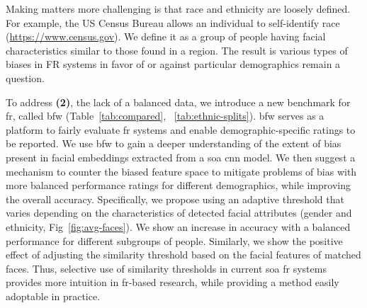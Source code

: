 Making matters more challenging is that race and ethnicity are loosely defined.  For example, the US Census Bureau allows an individual to self-identify race (\href{https://www.census.gov/mso/www/training/pdf/race-ethnicity-onepager.pdf}{https://www.census.gov}). We define it as a group of people having facial characteristics similar to those found in a region. The result is various types of biases in FR systems in favor of or against particular demographics remain a question.



To address \textbf{(2)}, the lack of a balanced data, we introduce a new benchmark for \gls{fr}, called \gls{bfw} (Table~\ref{tab:compared}, ~\ref{tab:ethnic-splits}). \gls{bfw} serves as a platform to fairly evaluate \gls{fr} systems and enable demographic-specific ratings to be reported. We use \gls{bfw} to gain a deeper understanding of the extent of bias present in facial embeddings extracted from a \gls{soa} \gls{cnn} model. We then suggest a mechanism to counter the biased feature space to mitigate problems of bias with more balanced performance ratings for different demographics, while improving the overall accuracy. Specifically, we propose using an adaptive threshold that varies depending on the characteristics of detected facial attributes (\ie gender and ethnicity, Fig~\ref{fig:avg-faces}). We show an increase in accuracy with a balanced performance for different subgroups of people. Similarly, we show the positive effect of adjusting the similarity threshold based on the facial features of matched faces. Thus, selective use of similarity thresholds in current \gls{soa} \gls{fr} systems provides more intuition in \gls{fr}-based research, while providing a method easily adoptable in practice. 


